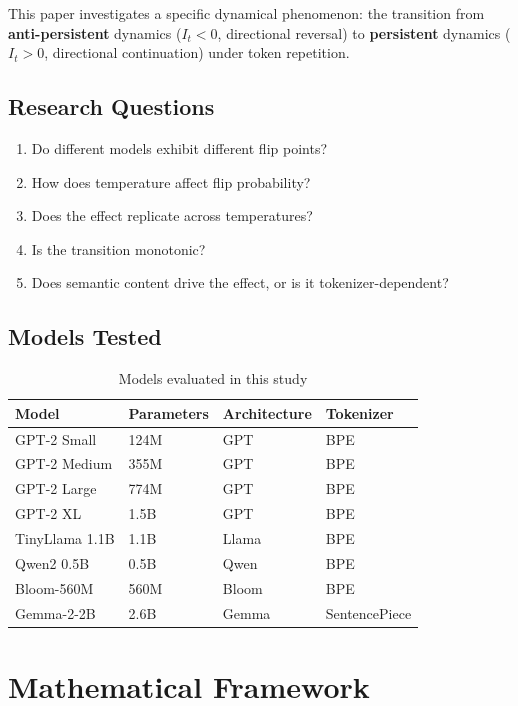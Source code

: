 \documentclass[12pt,a4paper]{article}
\begin{document}
This paper investigates a specific dynamical phenomenon: the transition from \textbf{anti-persistent} dynamics ($I_t < 0$, directional reversal) to \textbf{persistent} dynamics ($I_t > 0$, directional continuation) under token repetition.

\subsection{Research Questions}

\begin{enumerate}[noitemsep]
    \item Do different models exhibit different flip points?
    \item How does temperature affect flip probability?
    \item Does the effect replicate across temperatures?
    \item Is the transition monotonic?
    \item Does semantic content drive the effect, or is it tokenizer-dependent?
\end{enumerate}

\subsection{Models Tested}

\begin{table}[H]
\centering
\caption{Models evaluated in this study}
\begin{tabular}{llll}
\toprule
\textbf{Model} & \textbf{Parameters} & \textbf{Architecture} & \textbf{Tokenizer} \\
\midrule
GPT-2 Small & 124M & GPT & BPE \\
GPT-2 Medium & 355M & GPT & BPE \\
GPT-2 Large & 774M & GPT & BPE \\
GPT-2 XL & 1.5B & GPT & BPE \\
TinyLlama 1.1B & 1.1B & Llama & BPE \\
Qwen2 0.5B & 0.5B & Qwen & BPE \\
Bloom-560M & 560M & Bloom & BPE \\
Gemma-2-2B & 2.6B & Gemma & SentencePiece \\
\bottomrule
\end{tabular}
\end{table}

\section{Mathematical Framework}
\end{document}
